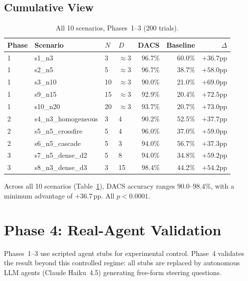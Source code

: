 \documentclass{article}
\begin{document}
\subsection{Cumulative View}

\begin{table}[t]
\caption{All 10 scenarios, Phases~1--3 (200 trials).}
\label{tab:all}
\centering
\small
\begin{tabular}{llllrrr}
\toprule
Phase & Scenario & $N$ & $D$ & DACS & Baseline & $\Delta$ \\
\midrule
1 & s1\_n3                & 3  & $\approx$3 & 96.7\% & 60.0\% & $+36.7$pp \\
1 & s2\_n5                & 5  & $\approx$3 & 96.7\% & 38.7\% & $+58.0$pp \\
1 & s3\_n10               & 10 & $\approx$3 & 90.0\% & 21.0\% & $+69.0$pp \\
1 & s9\_n15               & 15 & $\approx$3 & 92.9\% & 20.4\% & $+72.5$pp \\
1 & s10\_n20              & 20 & $\approx$3 & 93.7\% & 20.7\% & $+73.0$pp \\
2 & s4\_n3\_homogeneous   & 3  & 4          & 90.2\% & 52.5\% & $+37.7$pp \\
2 & s5\_n5\_crossfire     & 5  & 4          & 96.0\% & 37.0\% & $+59.0$pp \\
2 & s6\_n5\_cascade       & 5  & 3          & 94.0\% & 56.7\% & $+37.3$pp \\
3 & s7\_n5\_dense\_d2     & 5  & 8          & 94.0\% & 34.8\% & $+59.2$pp \\
3 & s8\_n3\_dense\_d3     & 3  & 15         & 98.4\% & 44.2\% & $+54.2$pp \\
\bottomrule
\end{tabular}
\end{table}

Across all 10 scenarios (Table~\ref{tab:all}), DACS accuracy ranges
$90.0$--$98.4\%$, with a minimum advantage of $+36.7$\,pp.
All $p < 0.0001$.

\section{Phase 4: Real-Agent Validation}
\label{sec:phase4}

Phases~1--3 use scripted agent stubs for experimental control.
Phase~4 validates the result beyond this controlled regime: all stubs
are replaced by autonomous LLM agents (Claude Haiku~4.5) generating
free-form steering questions.
\end{document}
